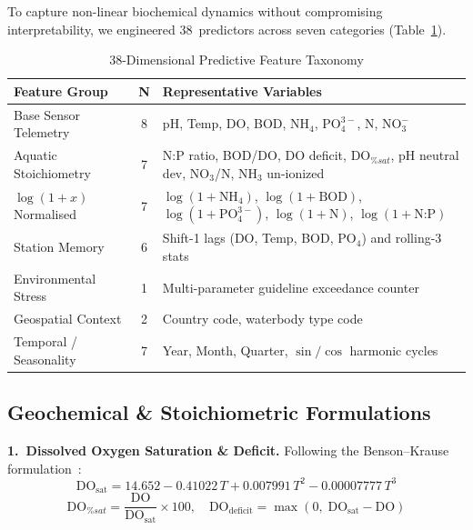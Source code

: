 \documentclass[conference]{IEEEtran}
\begin{document}
To capture non-linear biochemical dynamics without compromising
interpretability, we engineered 38~predictors across seven categories
(Table~\ref{tab:feature_taxonomy}).

\begin{table}[!t]
  \caption{38-Dimensional Predictive Feature Taxonomy}
  \label{tab:feature_taxonomy}
  \centering
  \setlength{\tabcolsep}{3pt}
  \begin{tabular}{>{\raggedright\arraybackslash}p{2.2cm}c>{\raggedright\arraybackslash}p{5.0cm}}
    \toprule
    \textbf{Feature Group} & \textbf{N} & \textbf{Representative Variables} \\
    \midrule
    Base Sensor Telemetry
      & 8
      & pH, Temp, DO, BOD, $\text{NH}_4$, $\text{PO}_4^{3-}$, N,
        $\text{NO}_3^-$ \\
    Aquatic Stoichiometry
      & 7
      & N:P ratio, BOD/DO, DO deficit, $\text{DO}_{\%sat}$,
        pH neutral dev, $\text{NO}_3$/N, NH$_3$ un-ionized \\
    $\log(1{+}x)$ Normalised
      & 7
      & $\log(1{+}\text{NH}_4)$, $\log(1{+}\text{BOD})$,
        $\log(1{+}\text{PO}_4^{3-})$, $\log(1{+}\text{N})$,
        $\log(1{+}\text{N:P})$ \\
    Station Memory
      & 6
      & Shift-1 lags (DO, Temp, BOD, PO$_4$) and rolling-3 stats \\
    Environmental Stress
      & 1
      & Multi-parameter guideline exceedance counter \\
    Geospatial Context
      & 2
      & Country code, waterbody type code \\
    Temporal / Seasonality
      & 7
      & Year, Month, Quarter, $\sin/\cos$ harmonic cycles \\
    \bottomrule
  \end{tabular}
\end{table}

\subsection{Geochemical \& Stoichiometric Formulations}

\noindent\textbf{1.\ Dissolved Oxygen Saturation \& Deficit.}
Following the Benson--Krause formulation~\cite{benson1984solubility}:
\begin{equation}
  \text{DO}_{\text{sat}} =
    14.652 - 0.41022\,T + 0.007991\,T^2 - 0.00007777\,T^3
\end{equation}
\begin{equation}
  \text{DO}_{\%sat} = \frac{\text{DO}}{\text{DO}_{\text{sat}}} \times 100,
  \quad
  \text{DO}_{\text{deficit}} = \max(0,\;\text{DO}_{\text{sat}} - \text{DO})
\end{equation}
\end{document}
